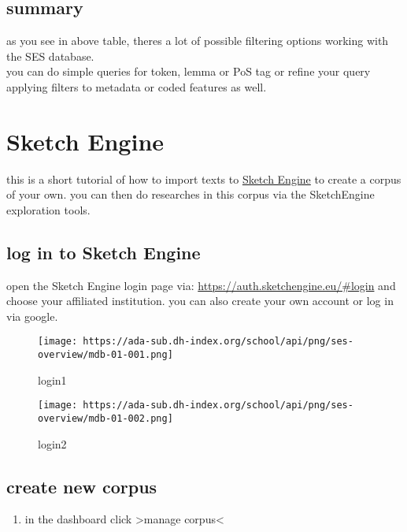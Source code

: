 \documentclass[
  12pt,
]{article}
\providecommand{\tightlist}{%
  \setlength{\itemsep}{0pt}\setlength{\parskip}{0pt}}
\begin{document}
\hypertarget{summary}{%
\subsection{summary}\label{summary}}

as you see in above table, theres a lot of possible filtering options
working with the SES database.\\
you can do simple queries for token, lemma or PoS tag or refine your
query applying filters to metadata or coded features as well.

\hypertarget{sketch-engine}{%
\section{Sketch Engine}\label{sketch-engine}}

this is a short tutorial of how to import texts to
\href{https://auth.sketchengine.eu/\#login}{Sketch Engine} to create a
corpus of your own. you can then do researches in this corpus via the
SketchEngine exploration tools.

\hypertarget{log-in-to-sketch-engine}{%
\subsection{log in to Sketch Engine}\label{log-in-to-sketch-engine}}

open the Sketch Engine login page via:
\url{https://auth.sketchengine.eu/\#login} and choose your affiliated
institution. you can also create your own account or log in via google.

\begin{figure}
\centering
\texttt{[image: https://ada-sub.dh-index.org/school/api/png/ses-overview/mdb-01-001.png]}
\caption{login1}
\end{figure}

\begin{figure}
\centering
\texttt{[image: https://ada-sub.dh-index.org/school/api/png/ses-overview/mdb-01-002.png]}
\caption{login2}
\end{figure}

\hypertarget{create-new-corpus}{%
\subsection{create new corpus}\label{create-new-corpus}}

\begin{enumerate}
\def\labelenumi{\arabic{enumi}.}
\tightlist
\item
  in the dashboard click \textgreater manage corpus\textless{}
\end{enumerate}
\end{document}
